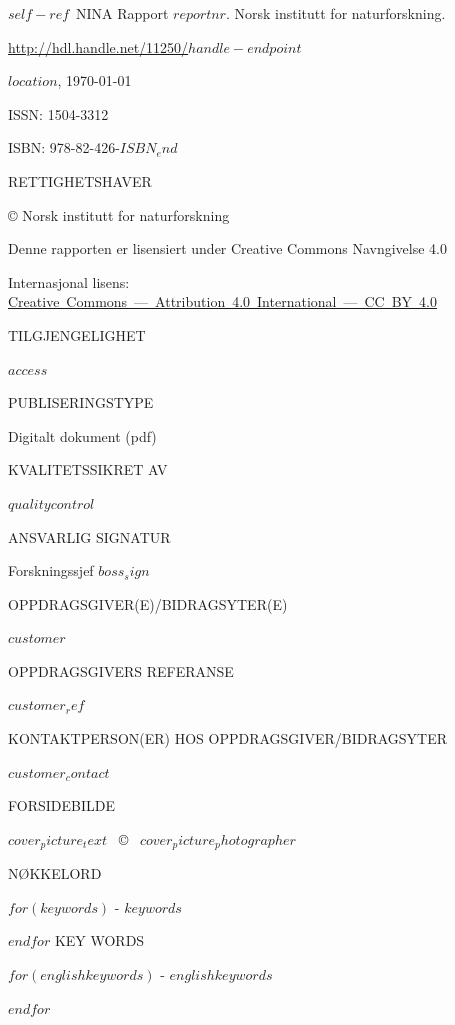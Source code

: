 \documentclass[11pt, a4paper]{article}
\renewcommand*{\href}[2]{\hyperref[#1]{\color{darkblue}\setulcolor{darkblue}\ul{\mbox{#2}}}}
\newcommand{\smallspace}{\vspace{3mm}}
\begin{document}
\normalsize
{}
\small{$self-ref$}~NINA Rapport $reportnr$. Norsk institutt for naturforskning. \par \href{http://hdl.handle.net/11250/$handle-endpoint$}{http://hdl.handle.net/11250/$handle-endpoint$} \par \smallspace
$location$, \ninadate\today \par \smallspace
ISSN: 1504-3312 \par
ISBN: 978-82-426-$ISBN_end$ \par  \smallspace
{\scriptsize{RETTIGHETSHAVER}} \par
© Norsk institutt for naturforskning  \par
Denne rapporten er lisensiert under Creative Commons Navngivelse 4.0 \par
Internasjonal lisens: \href{https://creativecommons.org/licenses/by/4.0/}{Creative Commons — Attribution 4.0 International — CC BY 4.0}\par \smallspace
{\scriptsize{TILGJENGELIGHET}} \par
$access$ \par \smallspace
{\scriptsize{PUBLISERINGSTYPE}} \par
Digitalt dokument (pdf) \par \smallspace
{\scriptsize{KVALITETSSIKRET AV}} \par
$qualitycontrol$ \par \smallspace
{\scriptsize{ANSVARLIG SIGNATUR}} \par
Forskningssjef $boss_sign$ \par \smallspace
{\scriptsize{OPPDRAGSGIVER(E)/BIDRAGSYTER(E)}} \par
$customer$ \par \smallspace
{\scriptsize{OPPDRAGSGIVERS REFERANSE}} \par
$customer_ref$ \par \smallspace
{\scriptsize{KONTAKTPERSON(ER) HOS OPPDRAGSGIVER/BIDRAGSYTER}} \par
$customer_contact$ \par \smallspace
{\scriptsize{FORSIDEBILDE}} \par
$cover_picture_text$~ \copyright~ $cover_picture_photographer$ \par \smallspace
{\scriptsize{NØKKELORD}} \par\smallskip
$for(keywords)$
\small{\hyp{} $keywords$} \par
$endfor$
\vspace{5mm}
{\scriptsize{KEY WORDS}} \par\smallskip
$for(englishkeywords)$
\small{\hyp{} $englishkeywords$} \par
$endfor$
\end{document}
